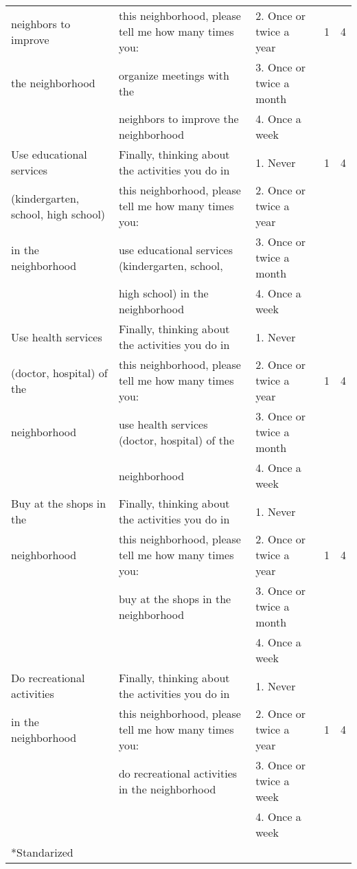 \begin{table}[htbp]
\begin{tiny}
\begin{tabular}{lllcc}
neighbors to improve 	&	this neighborhood, please tell me how many times you:	&	2. Once or twice a year	&	1	&	4	\\
the neighborhood	&	organize meetings with the 	&	3. Once or twice a month	&		&		\\
	&	neighbors to improve the neighborhood	&	4. Once a week	&		&		\\
Use educational services 	&	Finally, thinking about the activities you do in 	&	1. Never	&	1	&	4	\\
(kindergarten, school, high school)	&	this neighborhood, please tell me how many times you:	&	2. Once or twice a year	&		&		\\
 in the neighborhood	&	use educational services (kindergarten, school, 	&	3. Once or twice a month	&		&		\\
	&	high school) in the neighborhood	&	4. Once a week	&		&		\\
Use health services 	&	Finally, thinking about the activities you do in 	&	1. Never	&		&		\\
(doctor, hospital) of the	&	this neighborhood, please tell me how many times you:	&	2. Once or twice a year	&	1	&	4	\\
neighborhood	&	use health services (doctor, hospital) of the	&	3. Once or twice a month	&		&		\\
	&	neighborhood	&	4. Once a week	&		&		\\
Buy at the shops in the 	&	Finally, thinking about the activities you do in 	&	1. Never	&		&		\\
neighborhood	&	this neighborhood, please tell me how many times you:	&	2. Once or twice a year	&	1	&	4	\\
	&	buy at the shops in the neighborhood	&	3. Once or twice a month	&		&		\\
	&		&	4. Once a week	&		&		\\
Do recreational activities 	&	Finally, thinking about the activities you do in 	&	1. Never	&		&		\\
in the neighborhood	&	this neighborhood, please tell me how many times you:	&	2. Once or twice a year	&	1	&	4	\\
	&	do recreational activities in the neighborhood	&	3. Once or twice a week	&		&		\\
	&		&	4. Once a week	&		&		\\\hline
*Standarized
\end{tabular}
\end{tiny}
\end{table}

